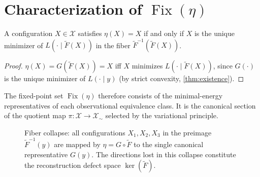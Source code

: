 \documentclass[12pt, oneside]{memoir}
\DeclareMathOperator{\Fix}{Fix}
\newcommand{\X}{\mathcal{X}}
\newcommand{\Ft}{\widetilde{F}}
\begin{document}
\section{Characterization of $\Fix(\eta)$}

\begin{proposition}
\label{prop:fix-char}
A configuration $X \in \X$ satisfies $\eta(X) = X$ if and only if $X$ is the unique
minimizer of $L(\cdot \mid \Ft(X))$ in the fiber $\Ft^{-1}(\Ft(X))$.
\end{proposition}

\begin{proof}
$\eta(X) = G(\Ft(X)) = X$ iff $X$ minimizes $L(\cdot \mid \Ft(X))$, since $G(\cdot)$ is
the unique minimizer of $L(\cdot \mid y)$ (by strict convexity, \cref{thm:existence}).
\end{proof}

The fixed-point set $\Fix(\eta)$ therefore consists of the minimal-energy representatives
of each observational equivalence class.  It is the canonical section of the quotient
map $\pi: \X \to \X_\sim$ selected by the variational principle.

\begin{figure}[htbp]
\centering
{}
\caption{Fiber collapse: all configurations $X_1, X_2, X_3$ in the preimage
$\Ft^{-1}(y)$ are mapped by $\eta = G \circ \Ft$ to the single canonical
representative $G(y)$.  The directions lost in this collapse constitute the
reconstruction defect space $\ker(\Ft)$.}
\label{fig:fiber-collapse}
\end{figure}
\end{document}
